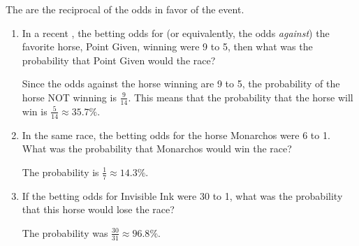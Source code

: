 \documentclass{ccg-topic}
\begin{document}
    \begin{todo}
        \label{todo:odds}
        The  are the reciprocal of the odds in favor of the event.  
        
            \begin{enumerate}
        
            \item In a recent , the betting odds for (or equivalently, the odds {\em against}) the favorite horse, Point Given, winning were 9 to 5, then what was the probability that Point Given would  the race? 
        
        	{\answer Since the odds against the horse winning are 9 to 5, the probability of the horse NOT winning is $\frac{9}{14}$.  This means that the probability that the horse will win is $\frac{5}{14} \approx 35.7\%$.} 
        
        
        	\item In the same race, the betting odds for the horse Monarchos were 6 to 1. What was the probability that Monarchos would win the race?
        
        	{\answer The probability is $\frac{1}{7} \approx 14.3\%$.}
        
        
        	\item If the betting odds for Invisible Ink were 30 to 1, what was the probability that this horse would lose the race?
        
        
        	{\answer The probability was $\frac{30}{31} \approx 96.8\%$.}
        
        
        	\end{enumerate}
    \end{todo}
\end{document}
